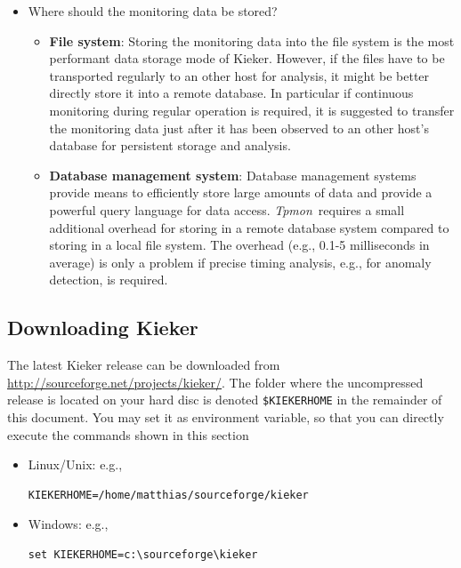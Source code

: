 \documentclass[a4paper,12pt]{scrartcl}
\newcommand{\tpmon}{\textit{Tpmon}}
\newcommand{\kieker}{\textit{Kieker}}
\newcommand{\kiekerurl}{\small\url{http://sourceforge.net/projects/kieker/}\normalsize}
\begin{document}
\begin{itemize}
\begin{itemize}
\end{itemize}
\item Where should the monitoring data be stored?
\begin{itemize}
\item \textbf{File system}: Storing the monitoring data into the file system is the most performant data storage mode of Kieker. However, if the files have to be transported regularly to an other host for analysis, it might be better directly store it into a remote database. In particular if continuous monitoring during regular operation is required, it is suggested to transfer the monitoring data just after it has been observed to an other host's database for persistent storage and analysis.
\item \textbf{Database management system}: Database management systems provide means to efficiently store large amounts of data and provide a powerful query language for data access. \tpmon\ requires a small additional overhead for storing in a remote database system compared to storing in a local file system. The overhead (e.g., 0.1-5 milliseconds in average) is only a problem if precise timing analysis, e.g., for anomaly detection, is required. %
\end{itemize}
\end{itemize}

\subsection{Downloading Kieker}
The latest Kieker release can be downloaded from \kiekerurl. The folder where the uncompressed release is located on your hard disc is denoted \texttt{\$KIEKERHOME} in the remainder of this document. You may set it as environment variable, so that you can directly execute the commands shown in this section
\begin{itemize}
 \item Linux/Unix: e.g.,
\begin{lstlisting}[caption={}]
KIEKERHOME=/home/matthias/sourceforge/kieker
\end{lstlisting}
\item Windows: e.g.,
\begin{lstlisting}[caption={}]
set KIEKERHOME=c:\sourceforge\kieker
\end{lstlisting}
\end{itemize}
\end{document}
